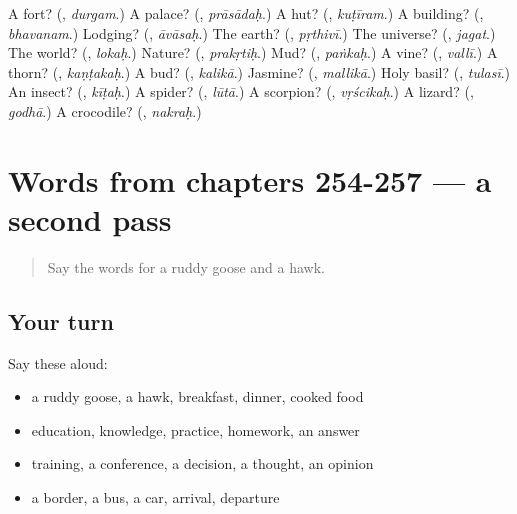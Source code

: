 \begin{tcolorbox}[breakable,colback=teal!4,colframe=teal!35!black,title={Before you move on}]
A fort? (\textbf{}, \emph{durgam}.) A palace? (\textbf{}, \emph{prāsādaḥ}.) A hut? (\textbf{}, \emph{kuṭīram}.) A building? (\textbf{}, \emph{bhavanam}.) Lodging? (\textbf{}, \emph{āvāsaḥ}.) The earth? (\textbf{}, \emph{pṛthivī}.) The universe? (\textbf{}, \emph{jagat}.) The world? (\textbf{}, \emph{lokaḥ}.) Nature? (\textbf{}, \emph{prakṛtiḥ}.) Mud? (\textbf{}, \emph{paṅkaḥ}.) A vine? (\textbf{}, \emph{vallī}.) A thorn? (\textbf{}, \emph{kaṇṭakaḥ}.) A bud? (\textbf{}, \emph{kalikā}.) Jasmine? (\textbf{}, \emph{mallikā}.) Holy basil? (\textbf{}, \emph{tulasī}.) An insect? (\textbf{}, \emph{kīṭaḥ}.) A spider? (\textbf{}, \emph{lūtā}.) A scorpion? (\textbf{}, \emph{vṛścikaḥ}.) A lizard? (\textbf{}, \emph{godhā}.) A crocodile? (\textbf{}, \emph{nakraḥ}.)
\end{tcolorbox}
\section[(dialogue)]{Words from chapters 254-257 — a second pass}

\label{lesson:SA-R257-second-pass-words-from-chapters-254-257}



\begin{quote}
Say the words for a ruddy goose and a hawk.
\end{quote}

\subsection*{Your turn}
Say these aloud:

\begin{itemize}
\raggedright
  \item a ruddy goose, a hawk, breakfast, dinner, cooked food
  \item education, knowledge, practice, homework, an answer
  \item training, a conference, a decision, a thought, an opinion
  \item a border, a bus, a car, arrival, departure
\end{itemize}

